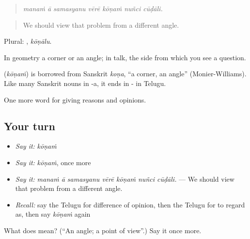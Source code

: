 \begin{quote}
\emph{manaṁ ā samasyanu vērē kōṇaṁ nuñci cūḍāli.}
\end{quote}

\begin{quote}
We should view that problem from a different angle.
\end{quote}

Plural: , \emph{kōṇālu}.

In geometry a corner or an angle; in talk, the side from which you see a question.

\begin{cousinweb}
\textbf{} (\emph{kōṇaṁ}) is borrowed from Sanskrit \emph{koṇa}, \textquotedblleft{}a corner, an angle\textquotedblright{} (Monier-Williams). Like many Sanskrit nouns in -a, it ends in - in Telugu.
\end{cousinweb}

\begin{grammarlens}[title={What you've built}]
One more word for giving reasons and opinions.
\end{grammarlens}

\subsection*{Your turn}
\begin{itemize}
\raggedright
  \item \emph{Say it:} \emph{kōṇaṁ}
  \item \emph{Say it:} \emph{kōṇaṁ}, once more
  \item \emph{Say it:} \emph{manaṁ ā samasyanu vērē kōṇaṁ nuñci cūḍāli.} — We should view that problem from a different angle.
  \item \emph{Recall:} say the Telugu for difference of opinion, then the Telugu for to regard as, then say \emph{kōṇaṁ} again
\end{itemize}

\begin{tcolorbox}[breakable,colback=teal!4,colframe=teal!35!black,title={Before you move on}]
What does  mean? (\textquotedblleft{}An angle; a point of view\textquotedblright{}.) Say it once more.
\end{tcolorbox}
